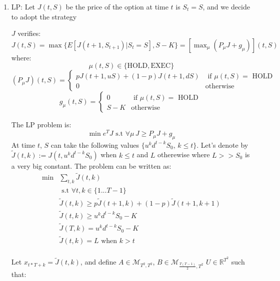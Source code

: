 \documentclass[12pt]{article}
\begin{document}
\begin{enumerate}
\item
  
  LP:
  Let $J(t, S)$ be the price of the option at time $t$ is $S_t = S$,
  and we decide to adopt the strategy 

  $J$ verifies: $J(t, S) = \max \{ E[J(t+1, S_{t+1}) | S_t = S], S - K \} = [\max_{\mu} (P_{\mu}J + g_\mu) ](t,S) $
  where:
  $$\mu(t, S) \in \{ \text{HOLD}, \text{EXEC} \}$$
  \[ (P_\mu J)(t, S) = \left\{
      \begin{array}{cc}
        p J(t+1, uS) + (1-p)J(t+1, dS) & \text{ if $\mu(t, S) = $ HOLD } \\
        0 & \text{otherwise}
      \end{array}
    \right.
  \]
  \[
    g_\mu(t, S) = \left\{
      \begin{array}{cc}
        0 & \text{ if $\mu(t, S) = $ HOLD } \\
        S - K & \text{otherwise}
      \end{array}
    \right.
  \]

  The LP problem is:
  $$\min e^T J \text{ s.t } \forall \mu \, J \ge P_\mu J + g_\mu$$
  At time $t$, $S$ can take the following values $\{ u^k d^{t-k} S_0,\, k \le t\}$. Let's denote by $\tilde J(t, k) := J(t, u^k d^{t-k} S_0)$ when $k \le t$ and $L$ otherewise where $L >> S_0$ is a very big constant.
  The problem can be written as:
  \begin{align*}
    \min &\sum_{t, k} \tilde J(t, k) \\
         &\text{ s.t } \forall t, k \in \{1...T-1\}\\
         & \tilde J(t, k) \ge p \tilde J(t+1, k) + (1-p) \tilde J(t+1, k+1) \\
         & \tilde J(t, k) \ge u^k d^{t-k} S_0 - K\\
         & \tilde J(T, k) = u^k d^{t-k} S_0 - K \\
         & \tilde J(t, k) = L \text{ when } k > t\\
  \end{align*}

  Let $x_{t*T + k} = \tilde J(t, k)$, and define $A \in \mathcal M_{T^2, T^2}$,
  $B \in \mathcal M_{\frac{T(T-1)}{2}, T^2}$ $U \in \mathbb R^{T^2}$ such that:


\end{enumerate}
\end{document}
